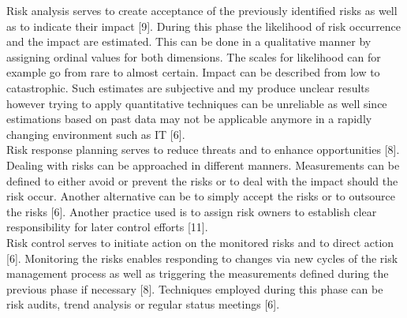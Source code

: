 Risk analysis serves to create acceptance of the previously identified risks as well as to indicate their impact [9]. During this phase the likelihood of risk occurrence and the impact are estimated. This can be done in a qualitative manner by assigning ordinal values for both dimensions. The scales for likelihood can for example go from rare to almost certain. Impact can be described from low to catastrophic. Such estimates are subjective and my produce unclear results however trying to apply quantitative techniques can be unreliable as well since estimations based on past data may not be applicable anymore in a rapidly changing environment such as IT [6].\\

Risk response planning serves to reduce threats and to enhance opportunities [8]. Dealing with risks can be approached in different manners. Measurements can be defined to either avoid or prevent the risks or to deal with the impact should the risk occur. Another alternative can be to simply accept the risks or to outsource the risks [6]. Another practice used is to assign risk owners to establish clear responsibility for later control efforts [11].\\

Risk control serves to initiate action on the monitored risks and to direct action [6]. Monitoring the risks enables responding to changes via new cycles of the risk management process as well as triggering the measurements defined during the previous phase if necessary [8].  Techniques employed during this phase can be risk audits, trend analysis or regular status meetings [6]. 


